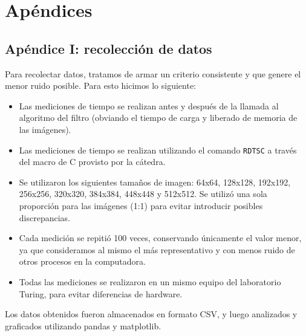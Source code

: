 \section{Apéndices}
 	\subsection{Apéndice I: recolección de datos}

 	Para recolectar datos, tratamos de armar un criterio consistente y que genere el menor ruido posible. Para esto hicimos lo siguiente:

 	\begin{itemize}
 		\item Las mediciones de tiempo se realizan antes y después de la llamada al algoritmo del filtro (obviando el tiempo de carga y liberado de memoria de las imágenes).

 		\item Las mediciones de tiempo se realizan utilizando el comando \texttt{RDTSC} a través del macro de C provisto por la cátedra.

 		\item Se utilizaron los siguientes tamaños de imagen: 64x64, 128x128, 192x192, 256x256, 320x320, 384x384, 448x448 y 512x512. Se utilizó una sola proporción para las imágenes (1:1) para evitar introducir posibles discrepancias. 

 		\item Cada medición se repitió 100 veces, conservando únicamente el valor menor, ya que consideramos al mismo el más representativo y con menos ruido de otros procesos en la computadora.

 		\item Todas las mediciones se realizaron en un mismo equipo del laboratorio Turing, para evitar diferencias de hardware.
 	\end{itemize}

 	Los datos obtenidos fueron almacenados en formato CSV, y luego analizados y graficados utilizando pandas y matplotlib.